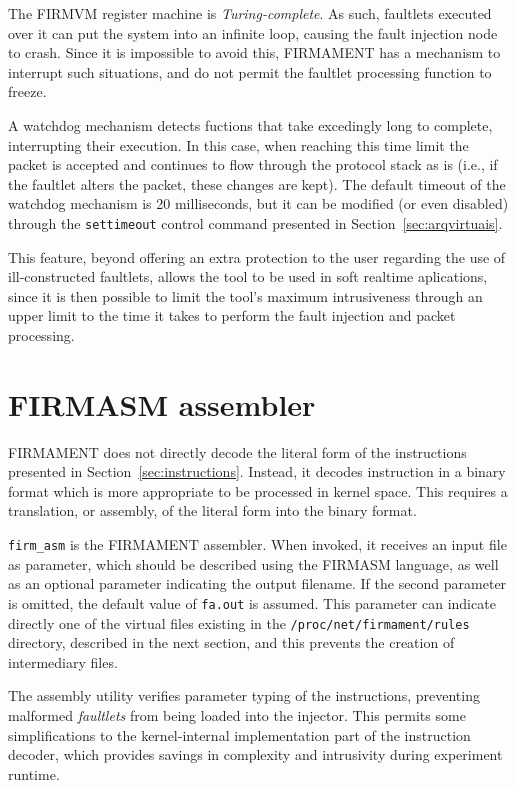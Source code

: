 \documentclass[11pt]{article}
\begin{document}
The \textsf{FIRMVM} register machine is {\em Turing-complete}. As such, faultlets executed over it can put the system into an infinite loop, causing the fault injection node to crash. Since it is impossible to avoid this, \textsf{FIRMAMENT} has a mechanism to interrupt such situations, and do not permit the faultlet processing function to freeze.

A watchdog mechanism detects fuctions that take excedingly long to complete, interrupting their execution. In this case, when reaching this time limit the packet is accepted and continues to flow through the protocol stack as is (i.e., if the faultlet alters the packet, these changes are kept). The default timeout of the watchdog mechanism is 20 milliseconds, but it can be modified (or even disabled) through the \texttt{settimeout} control command presented in Section~\ref{sec:arqvirtuais}.

This feature, beyond offering an extra protection to the user regarding the use of ill-constructed faultlets, allows the tool to be used in soft realtime aplications, since it is then possible to limit the tool's maximum intrusiveness through an upper limit to the time it takes to perform the fault injection and packet processing.

\section{\textsf{FIRMASM} assembler}\label{sec:firmasm}


\textsf{FIRMAMENT} does not directly decode the literal form of the instructions presented in Section~\ref{sec:instructions}. Instead, it decodes instruction in a binary format which is more appropriate to be processed in kernel space. This requires a translation, or assembly, of the literal form into the binary format.


\texttt{firm\_asm} is the \textsf{FIRMAMENT} assembler. When invoked, it receives an input file as parameter, which should be described using the \textsf{FIRMASM} language, as well as an optional parameter indicating the output filename. If the second parameter is omitted, the default value of \texttt{fa.out} is assumed. This parameter can indicate directly one of the virtual files existing in the \texttt{/proc/net/firmament/rules} directory, described in the next section, and this prevents the creation of intermediary files.

The assembly utility verifies parameter typing of the instructions, preventing malformed {\em faultlets} from being loaded into the injector. This permits some simplifications to the kernel-internal implementation part of the instruction decoder, which provides savings in complexity and intrusivity during experiment runtime.
\end{document}

